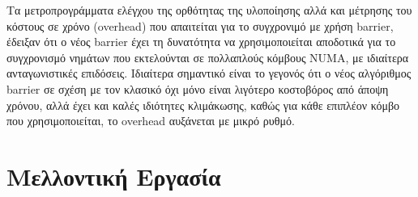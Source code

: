 Τα μετροπρογράμματα ελέγχου της ορθότητας της υλοποίησης αλλά και μέτρησης του κόστους σε χρόνο (overhead) που απαιτείται για το συγχρονιμό με χρήση barrier, έδειξαν ότι ο νέος barrier έχει τη δυνατότητα να χρησιμοποιείται αποδοτικά για το συγχρονισμό νημάτων που εκτελούνται σε πολλαπλούς κόμβους NUMA, με ιδιαίτερα ανταγωνιστικές επιδόσεις. Ιδιαίτερα σημαντικό είναι το γεγονός ότι ο νέος αλγόριθμος barrier σε σχέση με τον κλασικό όχι μόνο είναι λιγότερο κοστοβόρος από άποψη χρόνου, αλλά έχει και καλές ιδιότητες κλιμάκωσης, καθώς για κάθε επιπλέον κόμβο που χρησιμοποιείται, το overhead αυξάνεται με μικρό ρυθμό.


\section{Μελλοντική Εργασία}

